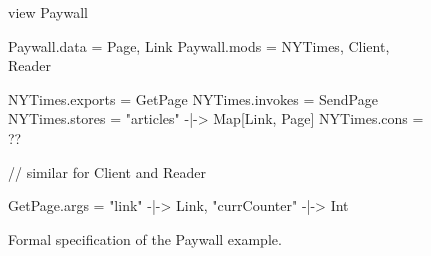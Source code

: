 \begin{figure}[ht]
\centering
  \begin{slangmath}[frame=single]
    view Paywall

    Paywall.data = {Page, Link}
    Paywall.mods = {NYTimes, Client, Reader}

    NYTimes.exports = {GetPage}
    NYTimes.invokes = {SendPage}
    NYTimes.stores  = {"articles" -|-> Map[Link, Page]}
    NYTimes.cons    = {??}

    // similar for Client and Reader

    GetPage.args = {"link" -|-> Link, "currCounter" -|-> Int}
  \end{slangmath}

\caption{Formal specification of the Paywall example.}
\label{fig-paywall-formal}
\end{figure}
